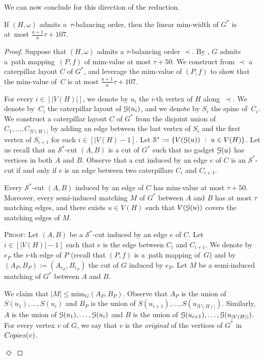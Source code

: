 \documentclass[a4paper,UKenglish,cleveref,hyperref,autoref]{lipics-v2021}
\renewcommand{\leq}{\leqslant}
\newenvironment{proofofclaim}{\noindent \textsc{Proof:}}{\hfill$\Diamond$\medskip}
\newcommand{\mim}{\text{mim}}
\newcommand{\pmap}{path mapping\xspace}
\begin{document}
We can now conclude for this direction of the reduction.

\begin{lemma}
If $(H, \omega)$ admits a~$\tau$-balancing order, then the linear mim-width of $G^*$ is at~most $\frac{a+1}{a} \tau + 107$.
\end{lemma}
\begin{proof}
	Suppose that $(H, \omega)$ admits a $\tau$-balancing order $\prec$.
	By , $G$ admits a~\pmap~$(P, f)$ of mim-value at most $\tau + 50$.
	We construct from $\prec$ a caterpillar layout $C$ of $G^*$, and leverage the mim-value of $(P, f)$ to show that the mim-value of~$C$ is at most $\frac{a+1}{a} \tau + 107$.
	
	For every $i \in [|V(H)|]$, we denote by $u_i$ the $i$-th vertex of $H$ along~$\prec$.
We denote by~$C_i$ the caterpillar layout of $\mathcal G(u_i)$, and we denote by $S_i$ the spine of~$C_i$.	
	We construct a caterpillar layout $C$ of $G^*$ from the disjoint union of $C_1,\dots,C_{|V(H)|}$ by adding an edge between the last vertex of $S_i$ and the first vertex of $S_{i+1}$ for each $i\in [|V(H)-1]$.
	Let $\mathcal S^* :=\{ V(\mathcal G(u))~:~u\in V(H)\}$.
	Let us recall that an $\mathcal S^*$-cut $(A,B)$ is a cut of $G^*$ such that no gadget $\mathcal G(u)$ has vertices in both $A$ and $B$. 
	Observe that a cut induced by an edge $e$ of $C$ is an $\mathcal S^*$-cut if and only if $e$ is an edge between two caterpillars $C_i$ and $C_{i+1}$.
	
	\begin{claim}\label{claim:glue-edges}
		Every $\mathcal S^*$-cut $(A,B)$ induced by an edge of $C$ has mim-value at most $\tau + 50$.
		Moreover, every semi-induced matching $M$ of $G^*$ between $A$ and $B$ has at most $\tau$ matching edges, and there exists $u\in V(H)$ such that $V(\mathcal G(u))$ covers the matching edges of $M$.
	\end{claim}
	\begin{proofofclaim}		
		Let $(A,B)$ be a $\mathcal S^*$-cut induced by an edge $e$ of $C$.
		Let $i\in [|V(H)|-1]$ such that $e$ is the edge between $C_i$ and $C_{i+1}$.
		We denote by $e_P$ the $i$-th edge of $P$ (recall that $(P,f)$ is a~\pmap of~$G$) and by $(A_P,B_P) := (A_{e_P}, B_{e_P})$ the cut of $G$ induced by $e_P$.
		Let $M$ be a semi-induced matching of $G^*$ between $A$ and $B$.
		
		We claim that $|M| \leq \mim_{G}(A_P,B_P)$.
		Observe that $A_P$ is the union of $S(u_1),\dots,S(u_i)$ and $B_P$ is the union of $S(u_{i+1}),\dots,S(u_{|V(H)|})$.
		Similarly, $A$ is the union of $\mathcal G(u_1),\dots,\mathcal G(u_i)$ and $B$ is the union of $\mathcal G(u_{i+1}),\dots,\mathcal G(u_{|V(H)|})$.
		For every vertex $v$ of $G$, we say that $v$ is the \emph{original} of the vertices of $G^*$ in $\copies(v)$.
		

\end{proofofclaim}
\end{proof}
\end{document}
